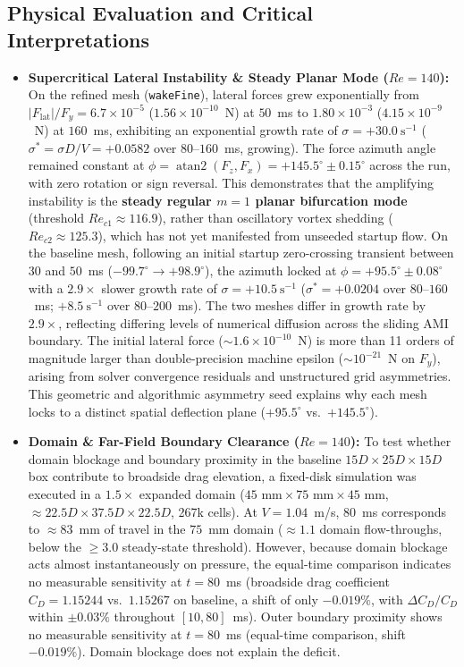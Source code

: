 \documentclass[11pt,a4paper]{article}
\begin{document}
\subsection{Physical Evaluation and Critical Interpretations}
\begin{itemize}
    \item \textbf{Supercritical Lateral Instability \& Steady Planar Mode ($Re = 140$):} On the refined mesh (\texttt{wakeFine}), lateral forces grew exponentially from $|F_{\mathrm{lat}}|/F_y = 6.7 \times 10^{-5}$ ($1.56 \times 10^{-10}$~N) at $50$~ms to $1.80 \times 10^{-3}$ ($4.15 \times 10^{-9}$~N) at $160$~ms, exhibiting an exponential growth rate of $\sigma = +30.0\ \mathrm{s}^{-1}$ ($\sigma^* = \sigma D / V = +0.0582$ over $80$--$160$~ms, growing). The force azimuth angle remained constant at $\phi = \operatorname{atan2}(F_z, F_x) = +145.5^\circ \pm 0.15^\circ$ across the run, with zero rotation or sign reversal. This demonstrates that the amplifying instability is the \textbf{steady regular $m = 1$ planar bifurcation mode} (threshold $Re_{c1} \approx 116.9$), rather than oscillatory vortex shedding ($Re_{c2} \approx 125.3$), which has not yet manifested from unseeded startup flow. On the baseline mesh, following an initial startup zero-crossing transient between $30$ and $50$~ms ($-99.7^\circ \to +98.9^\circ$), the azimuth locked at $\phi = +95.5^\circ \pm 0.08^\circ$ with a $2.9\times$ slower growth rate of $\sigma = +10.5\ \mathrm{s}^{-1}$ ($\sigma^* = +0.0204$ over $80$--$160$~ms; $+8.5\ \mathrm{s}^{-1}$ over $80$--$200$~ms). The two meshes differ in growth rate by $2.9\times$, reflecting differing levels of numerical diffusion across the sliding AMI boundary. The initial lateral force ($\sim 1.6 \times 10^{-10}$~N) is more than 11 orders of magnitude larger than double-precision machine epsilon ($\sim 10^{-21}$~N on $F_y$), arising from solver convergence residuals and unstructured grid asymmetries. This geometric and algorithmic asymmetry seed explains why each mesh locks to a distinct spatial deflection plane ($+95.5^\circ$ vs.\ $+145.5^\circ$).
    \item \textbf{Domain \& Far-Field Boundary Clearance ($Re = 140$):} To test whether domain blockage and boundary proximity in the baseline $15D \times 25D \times 15D$ box contribute to broadside drag elevation, a fixed-disk simulation was executed in a $1.5\times$ expanded domain ($45\text{ mm} \times 75\text{ mm} \times 45\text{ mm}$, $\approx 22.5D \times 37.5D \times 22.5D$, 267k cells). At $V = 1.04$~m/s, $80$~ms corresponds to $\approx 83$~mm of travel in the $75$~mm domain ($\approx 1.1$ domain flow-throughs, below the $\ge 3.0$ steady-state threshold). However, because domain blockage acts almost instantaneously on pressure, the equal-time comparison indicates no measurable sensitivity at $t = 80$~ms (broadside drag coefficient $C_D = 1.15244$ vs.\ $1.15267$ on baseline, a shift of only $\mathbf{-0.019\%}$, with $\Delta C_D / C_D$ within $\pm 0.03\%$ throughout $[10, 80]$~ms). Outer boundary proximity shows no measurable sensitivity at $t = 80$~ms (equal-time comparison, shift $-0.019\%$). Domain blockage does not explain the deficit.

\end{itemize}
\end{document}
